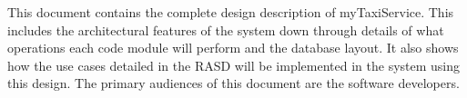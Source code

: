 This document contains the complete design description of myTaxiService. This includes the architectural features of the system down through details of what operations each code module will perform and the database layout. It also shows how the use cases detailed in the RASD will be implemented in the system using this design. The primary audiences of this document are the software developers.
